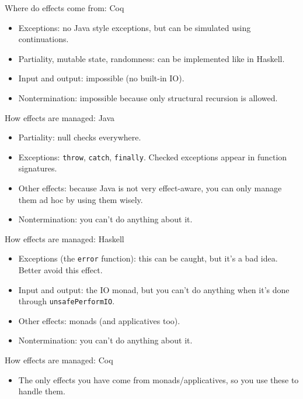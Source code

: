 \documentclass{beamer}
\begin{document}
\begin{frame}{Where do effects come from: Coq}
\begin{itemize}
	\item Exceptions: no Java style exceptions, but can be simulated using continuations.
	\item Partiality, mutable state, randomness: can be implemented like in Haskell.
	\item Input and output: impossible (no built-in IO).
	\item Nontermination: impossible because only structural recursion is allowed.
\end{itemize}
\end{frame}

\begin{frame}{How effects are managed: Java}
\begin{itemize}
	\item Partiality: null checks everywhere.
	\item Exceptions: \texttt{throw}, \texttt{catch}, \texttt{finally}. Checked exceptions appear in function signatures.
	\item Other effects: because Java is not very effect-aware, you can only manage them ad hoc by using them wisely.
	\item Nontermination: you can't do anything about it.
\end{itemize}
\end{frame}

\begin{frame}{How effects are managed: Haskell}
\begin{itemize}
	\item Exceptions (the \texttt{error} function): this can be caught, but it's a bad idea. Better avoid this effect.
	\item Input and output: the IO monad, but you can't do anything when it's done through \texttt{unsafePerformIO}.
	\item Other effects: monads (and applicatives too).
	\item Nontermination: you can't do anything about it.
\end{itemize}
\end{frame}

\begin{frame}{How effects are managed: Coq}
\begin{itemize}
	\item The only effects you have come from monads/applicatives, so you use these to handle them.
\end{itemize}
\end{frame}
\end{document}
